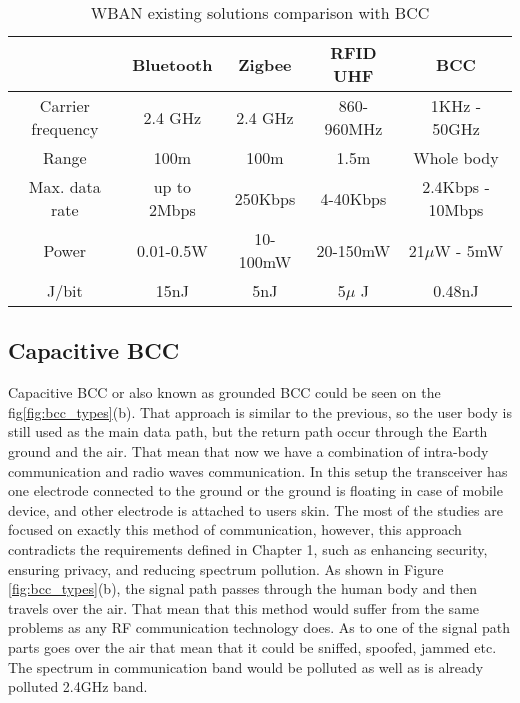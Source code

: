 \begin{table}
\footnotesize
\begin{minipage}[b]{\hsize}\centering

 \caption {WBAN existing solutions comparison with BCC} 

  \begin{tabular}{*{5}{|c}|}

    \hline
        &   Bluetooth   &   Zigbee    &   RFID UHF   & BCC \\\hline
    Carrier frequency   &   2.4 GHz     &   2.4 GHz     &   860-960MHz  &   1KHz - 50GHz \\\hline 
    Range               &   100m        &   100m        &   1.5m    &   Whole body \\ \hline
    Max. data rate      &   up to 2Mbps &   250Kbps     &   4-40Kbps    &   2.4Kbps - 10Mbps \\ \hline
    Power               &   0.01-0.5W   &   10-100mW    &   20-150mW    &   21$\mu$W - 5mW \\ \hline
    J/bit               &   15nJ        &   5nJ         &   5$\mu$ J    &   0.48nJ \\ \hline
    \end{tabular}

      \label{tab:comparing_solutions} 
      \end{minipage}
\end{table}


\subsection{Capacitive BCC}




\quad Capacitive BCC or also known as grounded BCC could be seen on the fig\ref{fig:bcc_types}(b). That approach is similar to the previous, so the user body is still used as the main data path, but the return path occur through the Earth ground and the air. That mean that now we have a combination of intra-body communication and radio waves communication. In this setup the transceiver has one electrode connected to the ground or the ground is floating in case of mobile device, and other electrode is attached to users skin. The most of the studies are focused on exactly this method of communication, however, this approach contradicts the requirements defined in Chapter 1, such as enhancing security, ensuring privacy, and reducing spectrum pollution. As shown in Figure \ref{fig:bcc_types}(b), the signal path passes through the human body and then travels over the air. That mean that this method would suffer from the same problems as any RF communication technology does. As to one of the signal path parts goes over the air that mean that it could be sniffed, spoofed, jammed etc. The spectrum in communication band would be polluted as well as is already polluted 2.4GHz band.





